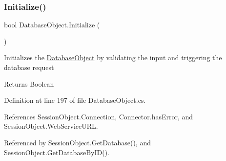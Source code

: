 \subsubsection{\texorpdfstring{Initialize()}{Initialize()}}
{\footnotesize\ttfamily bool Database\+Object.\+Initialize (\begin{DoxyParamCaption}{ }\end{DoxyParamCaption})}



Initializes the \mbox{\hyperlink{class_database_object}{Database\+Object}} by validating the input and triggering the database request 

\begin{DoxyReturn}{Returns}
Boolean
\end{DoxyReturn}


Definition at line 197 of file Database\+Object.\+cs.



References Session\+Object.\+Connection, Connector.\+has\+Error, and Session\+Object.\+Web\+Service\+U\+RL.



Referenced by Session\+Object.\+Get\+Database(), and Session\+Object.\+Get\+Database\+By\+I\+D().


